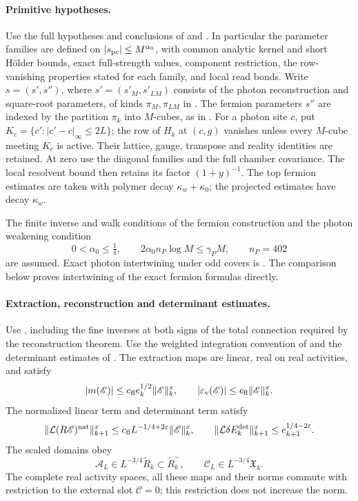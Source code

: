 \paragraph{Primitive hypotheses.}
Use the full hypotheses and conclusions of
\cite[Theorems A--B and Proposition 5.1]{MaxwellBlockManuscript}
and \cite[Theorem A and Propositions 4.1--4.3]{FermionBlockManuscript}.
In particular the parameter families are defined on
\(|s_{\rm pc}|\le M^{\alpha_0}\), with common analytic kernel and
short H\"older bounds, exact full-strength values, component
restriction, the row-vanishing properties stated for each family,
and local read bonds.
Write $s=(s',s'')$, where $s'=(s'_M,s'_{LM})$ consists of
the photon reconstruction and square-root parameters, of kinds
$\pi_M,\pi_{LM}$ in \cite[(37)]{MaxwellBlockManuscript}.
The fermion parameters $s''$ are indexed by the partition
$\pi_k$ into $M$-cubes, as in
\cite[\S4.1]{FermionBlockManuscript}.
For a photon site $c$, put
$K_c=\{c':|c'-c|_\infty\le2L\}$; the row of $H_k$ at $(c,g)$
vanishes unless every $M$-cube meeting $K_c$ is active.
Their lattice, gauge, transpose and reality identities are retained.
At zero use the diagonal families and the full chamber covariance.
The local resolvent bound then retains its factor \((1+y)^{-1}\).
The top fermion estimates are taken with polymer decay
\(\kappa_w+\kappa_0\); the projected estimates have decay \(\kappa_w\).

The finite inverse and walk conditions of the fermion construction
and the photon weakening condition
\[
 0<\alpha_0\le\tfrac14,\qquad
 2\alpha_0 n_P\log M\le\gamma_PM,\qquad n_P=402
\]
are assumed. Exact photon intertwining under odd covers is
\cite[(46)]{MaxwellBlockManuscript}. The comparison below proves
intertwining of the exact fermion formulas directly.

\paragraph{Extraction, reconstruction and determinant estimates.}
Use \cite[Theorems A--B and Appendix B]{NormalizedContraction},
including the fine inverses at both signs of the total connection
required by the reconstruction theorem.
Use the weighted integration convention of
\cite[Theorem B and Proposition 5.1]{FermionBlockManuscript}
and the determinant estimates of
\cite[Propositions 6.1--6.2]{FermionBlockManuscript}.
The extraction maps are linear, real on real activities, and satisfy
\[
 |m(\mathscr E)|\le c_{\rm fl}e_k^{1/2}\|\mathscr E\|_k^x,\qquad
 |\varepsilon_{\rm v}(\mathscr E)|\le c_{\rm fl}\|\mathscr E\|_k^x .
\]
The normalized linear term and determinant term satisfy
\[
 \|\mathcal L(R\mathscr E)^{\rm nat}\|_{k+1}^x
      \le c_{\rm fl}L^{-1/4+2\varepsilon}\|\mathscr E\|_k^x,
 \qquad
 \|\mathcal L\delta E_k^{\rm det}\|_{k+1}^x
      \le e_{k+1}^{1/4-2\varepsilon}.
\]
The scaled domains obey
\[
 \mathscr A_L\in L^{-3/4}\widetilde R_k\subset\widetilde R_k^-,
 \qquad \mathscr C_L\in L^{-3/4}\mathfrak X_k.
\]
The complete real activity spaces, all these maps and their norms
commute with restriction to the external slot \(\mathscr C=0\);
this restriction does not increase the norm.

